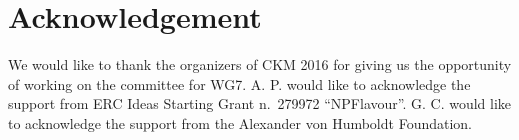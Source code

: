 \documentclass{PoS}
\begin{document}
\section{Acknowledgement}
\label{sec:ack}
We would like to thank the organizers of CKM 2016 for giving us the
opportunity of working on the committee for WG7. A. P. would like to
acknowledge the support from ERC Ideas Starting Grant n.~279972
``NPFlavour''. G. C. would like to acknowledge the support from the
Alexander von Humboldt Foundation.



\end{document}
